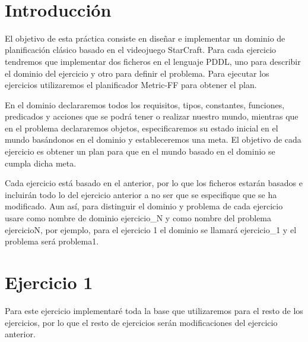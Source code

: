 \documentclass[11pt, spanish]{article}
\makeatletter
\let\thedate\@date
\makeatother
\begin{document}
\begin{titlepage}
    {\large \thedate}\\[0.5cm]
    {\doclicenseThis}
 	
    \vfill
    
\end{titlepage}




\section*{Introducción}

El objetivo de esta práctica consiste en diseñar e implementar un dominio de planificación clásico basado en el videojuego StarCraft. Para cada ejercicio tendremos que implementar dos ficheros en el lenguaje PDDL, uno para describir el dominio del ejercicio y otro para definir el problema. Para ejecutar los ejercicios utilizaremos el planificador Metric-FF para obtener el plan.

En el dominio declararemos todos los requisitos, tipos, constantes, funciones, predicados y acciones que se podrá tener o realizar nuestro mundo, mientras que en el problema declararemos objetos, especificaremos su estado inicial en el mundo basándonos en el dominio y estableceremos una meta. El objetivo de cada ejercicio es obtener un plan para que en el mundo basado en el dominio se cumpla dicha meta.

Cada ejercicio está basado en el anterior, por lo que los ficheros estarán basados e incluirán todo lo del ejercicio anterior a no ser que se especifique que se ha modificado.  Aun así, para distinguir el dominio y problema de cada ejercicio usare como nombre de dominio ejercicio\_N y como nombre del problema ejercicioN, por ejemplo, para el ejercicio 1 el dominio se llamará ejercicio\_1 y el problema será problema1.

\section{Ejercicio 1}

Para este ejercicio implementaré toda la base que utilizaremos para el resto de los ejercicios, por lo que el resto de ejercicios serán modificaciones del ejercicio anterior. 
\end{document}
